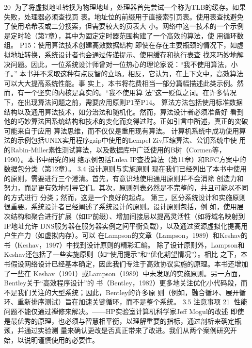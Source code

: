                                                    20
为了将虚拟地址转换为物理地址，处理器首先尝试一个称为TLB的缓存。如果失败，处理器必须查找页
表。地址位的前缀用于直接索引页表。使用表查找避免了使用哈希表或二分搜索，但需要较大的页表大
小。网络中这一技术的一个示例是定时轮（第7章），其中为固定定时器范围构建了一个高效的算法，使
用循环数组。
P15：使用算法技术创建高效数据结构
即使在存在主要瓶颈的情况下，如虚拟地址转换，系统设计者也会通过传递提示、使用缓存和执行表查
找来巧妙地解决问题。因此，一位系统设计师曾对一位热心的理论家说：“我不使用算法，小子。”
本书并不采取这种有点反智的立场。相反，它认为，在上下文中，高效算法可以大大提高系统性能。事
实上，本书将花费相当一部分篇幅描述此类示例。然而，有一个坚实的内核是真实的。“我不使用算
法”这一贬低之词。在许多情况下，在出现算法问题之前，需要应用原则P1至P14。
算法方法包括使用标准数据结构以及通用算法技术，如分治法和随机化。然而，算法设计者必须准备好
看到他的巧妙算法因系统结构和技术的变化而变得过时。正如引言中所述，真正的突破可能来自于应用
算法思维，而不仅仅是重用现有算法。
计算机系统中成功使用算法的示例包括UNIX实用程序gzip中使用的Lempel-Ziv压缩算法、公钥系统中使
用的Rabin-Miller素性测试算法，以及数据库中广泛使用的B树（Cormen等，1990）。本书中研究的网
络示例包括Lulea IP查找算法（第11章）和RFC方案中的数据包分类（第12章）。
3.4 设计原则与实施原则
现在我们已经列出了本书中使用的原则，需要进行三个澄清。首先，有意识地使用通用原则并不会消除
创造力和努力，而是更有效地引导它们。其次，原则列表必然是不完整的，并且可能以不同的方式进行
分类；然而，这是一个良好的起点。
第三，区分系统设计和实施原则很重要。系统设计者已经阐述了系统设计的原则。设计原则包括，例
如，使用层次结构和聚合进行扩展（如IP前缀）、增加间接层以提高灵活性（如将域名映射到IP地址允许
DNS服务器在服务器实例之间平衡负载），以及通过资源虚拟化提高用户生产力（如虚拟内存）。可以
在Lampson的文章（Lampson，1989）和Keshav的书（Keshav，1997）中找到设计原则的精彩汇编。
除了设计原则外，Lampson和Keshav还包括了一些实施原则（如“使用提示”和“优化期望情况”）。相比
之下，本书假设网络设计已经基本确定，因此我们专注于高效协议实施的原理。本书还增加了一些在
Keshav（1991）或Lampson（1989）中未发现的实施原则。另一方面，Bentley关于“高效程序设计”的
书（Bentley，1982）更多地关注优化小代码段，而不是我们关注的大型系统；因此，Bentley的许多原
则（例如，融合循环、展开循环、重新排序测试）旨在加速关键循环，而不是整个系统。
3.5 注意事项
                                                          21
性能问题不能仅通过禅修来解决。——HP实验室计算机科学家Jeff Mogul的改述
即使是最优秀的原理，也必须与智慧相平衡，以理解重要的指标，通过剖析来确定瓶颈，并通过实验测
量来确认更改是否真正带来了改进。我们从两个案例研究开始，以说明谨慎使用的必要性。
